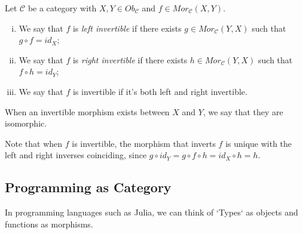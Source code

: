 \begin{definition}
  Let $\mathcal C$ be a category with $X,Y \in Ob_\mathcal C$ and $f \in Mor_\mathcal C (X,Y)$.
  \begin{enumerate}[(i)]
    \item We say that $f$ is \textit{left invertible} if there exists $g \in Mor_\mathcal C (Y,X)$ such
      that $g \circ f = id_X$;
    \item We say that $f$ is \textit{right invertible} if there exists $h \in Mor_\mathcal C (Y,X)$ such
      that $f \circ h = id_Y$;
    \item We say that $f$ is invertible if it's both left and right invertible.
  \end{enumerate}
  When an invertible morphism exists between $X$ and $Y$, we say that they are isomorphic.
\end{definition}
Note that when $f$ is invertible, the morphism that inverts $f$ is unique with the left and
right inverses coinciding, since
$g \circ id_Y = g \circ f \circ h = id_X \circ h = h$.

\subsection{Programming as Category}

In programming languages such as Julia, we can think of `Types`
as objects and functions as morphisms.
